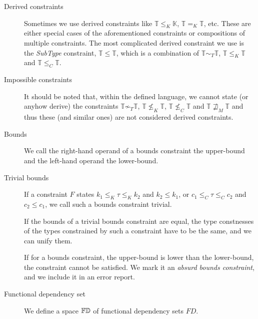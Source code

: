 \begin{description}
    \item[Derived constraints] Sometimes we use derived constraints like $\mathbb{T} \leq_K \mathbb{K}$, $\mathbb{T} =_K \mathbb{T}$, etc. These are either special cases of the aforementioned constraints or compositions of multiple constraints. The most complicated derived constraint we use is the \emph{SubType} constraint, $\mathbb{T} \leq \mathbb{T}$, which is a combination of $\mathbb{T} \sim_T \mathbb{T}$, $\mathbb{T} \leq_K \mathbb{T}$ and $\mathbb{T} \leq_C \mathbb{T}$.

    \item[Impossible constraints] It should be noted that, within the defined language, we cannot state (or anyhow derive) the constraints $\mathbb{T} \not\sim_T \mathbb{T}$, $\mathbb{T} \not\leq_K \mathbb{T}$, $\mathbb{T} \not\leq_C \mathbb{T}$ and $\mathbb{T} \not\sqsupseteq_M \mathbb{T}$ and thus these (and similar ones) are not considered derived constraints.

    \item[Bounds] We call the right-hand operand of a bounds constraint the upper-bound and the left-hand operand the lower-bound.

    \item[Trivial bounds] If a constraint $F$ states $k_1 \leq_K \tau \leq_K k_2$ and $k_2 \leq k_1$, or $c_1 \leq_C \tau \leq_C c_2$ and $c_2 \leq c_1$, we call such a bounds constraint trivial.

    If the bounds of a trivial bounds constraint are equal, the type constnesses of the types constrained by such a constraint have to be the same, and we can unify them.

    If for a bounds constraint, the upper-bound is lower than the lower-bound, the constraint cannot be satisfied. We mark it an \emph{absurd bounds constraint}, and we include it in an error report.

    \item[Functional dependency set] We define a space $\mathbb{FD}$ of functional dependency sets $FD$.


\end{description}
